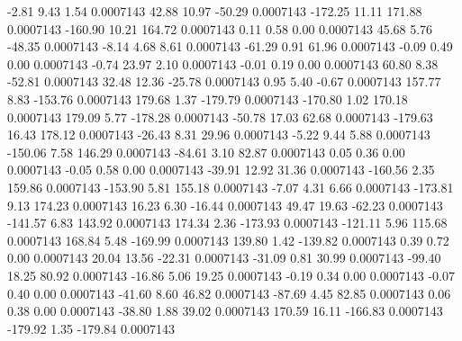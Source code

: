        -2.81        9.43        1.54     0.0007143
       42.88       10.97      -50.29     0.0007143
     -172.25       11.11      171.88     0.0007143
     -160.90       10.21      164.72     0.0007143
        0.11        0.58        0.00     0.0007143
       45.68        5.76      -48.35     0.0007143
       -8.14        4.68        8.61     0.0007143
      -61.29        0.91       61.96     0.0007143
       -0.09        0.49        0.00     0.0007143
       -0.74       23.97        2.10     0.0007143
       -0.01        0.19        0.00     0.0007143
       60.80        8.38      -52.81     0.0007143
       32.48       12.36      -25.78     0.0007143
        0.95        5.40       -0.67     0.0007143
      157.77        8.83     -153.76     0.0007143
      179.68        1.37     -179.79     0.0007143
     -170.80        1.02      170.18     0.0007143
      179.09        5.77     -178.28     0.0007143
      -50.78       17.03       62.68     0.0007143
     -179.63       16.43      178.12     0.0007143
      -26.43        8.31       29.96     0.0007143
       -5.22        9.44        5.88     0.0007143
     -150.06        7.58      146.29     0.0007143
      -84.61        3.10       82.87     0.0007143
        0.05        0.36        0.00     0.0007143
       -0.05        0.58        0.00     0.0007143
      -39.91       12.92       31.36     0.0007143
     -160.56        2.35      159.86     0.0007143
     -153.90        5.81      155.18     0.0007143
       -7.07        4.31        6.66     0.0007143
     -173.81        9.13      174.23     0.0007143
       16.23        6.30      -16.44     0.0007143
       49.47       19.63      -62.23     0.0007143
     -141.57        6.83      143.92     0.0007143
      174.34        2.36     -173.93     0.0007143
     -121.11        5.96      115.68     0.0007143
      168.84        5.48     -169.99     0.0007143
      139.80        1.42     -139.82     0.0007143
        0.39        0.72        0.00     0.0007143
       20.04       13.56      -22.31     0.0007143
      -31.09        0.81       30.99     0.0007143
      -99.40       18.25       80.92     0.0007143
      -16.86        5.06       19.25     0.0007143
       -0.19        0.34        0.00     0.0007143
       -0.07        0.40        0.00     0.0007143
      -41.60        8.60       46.82     0.0007143
      -87.69        4.45       82.85     0.0007143
        0.06        0.38        0.00     0.0007143
      -38.80        1.88       39.02     0.0007143
      170.59       16.11     -166.83     0.0007143
     -179.92        1.35     -179.84     0.0007143
